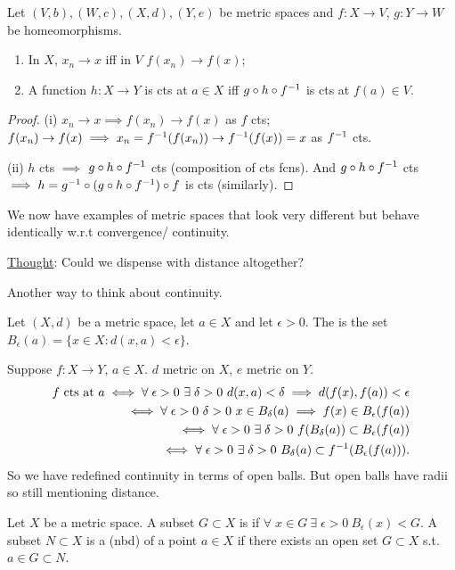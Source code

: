 \begin{proposition}
    Let $(V, b), (W, c), (X, d), (Y, e)$ be metric spaces and $f : X \to V$, $g:Y \to W$ be homeomorphisms.
    \begin{enumerate}
        \item In $X$, $x_n \to x$ iff in $V$ $f(x_n) \to f(x)$;
        \item A function $h: X \to Y$ is cts at $a \in X$ iff $g \circ h \circ f^{-1}$ is cts at $f(a) \in V$.
    \end{enumerate} 
\end{proposition} 

\begin{proof}
    (i) $x_n \to x \implies f(x_n) \to f(x)$ as $f$ cts; $f(x_n) \to f(x) \implies x_n = f^{-1}(f(x_n)) \to f^{-1} (f(x)) = x$ as $f^{-1}$ cts.

    (ii) $h$ cts $\implies$ $g \circ h \circ f^{-1}$ cts (composition of cts fcns).
    And $g \circ h \circ f^{-1}$ cts $\implies h = g^{-1} \circ (g \circ h \circ f^{-1}) \circ f$ is cts (similarly).
\end{proof} 

We now have examples of metric spaces that look very different but behave identically w.r.t convergence/ continuity.

\underline{Thought}: Could we dispense with distance altogether?

Another way to think about continuity.

\begin{definition}
    Let $(X, d)$ be a metric space, let $a \in X$ and let $\epsilon > 0$.
    The  is the set $B_\epsilon(a) = \{ x \in X : d(x, a) < \epsilon\}$.
\end{definition} 

\begin{remark}
    Suppose $f: X \to Y$, $a \in X$.
    $d$ metric on $X$, $e$ metric on $Y$.
    \begin{align*}
        f \text{ cts at } a \iff \forall \; \epsilon > 0 \ \exists \; \delta > 0 \ d(x, a) < \delta \implies d(f(x), f(a)) < \epsilon \\
        \iff \forall \; \epsilon > 0 \ \delta > 0 \ x \in B_\delta(a) \implies f(x) \in B_\epsilon(f(a)) \\
        \iff \forall \; \epsilon > 0 \ \exists \; \delta > 0 \ f(B_\delta(a)) \subset B_\epsilon(f(a)) \\
        \iff \forall \; \epsilon > 0 \ \exists \; \delta > 0 \ B_\delta(a) \subset f\inv(B_\epsilon(f(a))).
    \end{align*} 
    So we have redefined continuity in terms of open balls.
    But open balls have radii so still mentioning distance.
\end{remark} 

\begin{definition}
    Let $X$ be a metric space.
    A subset $G \subset X$ is  if $\forall \; x \in G \ \exists \; \epsilon > 0 \ B_\epsilon(x) < G$.
    A subset $N \subset X$ is a  (nbd) of a point $a \in X$ if there exists an open set $G \subset X$ s.t. $a \in G \subset N$.
\end{definition} 